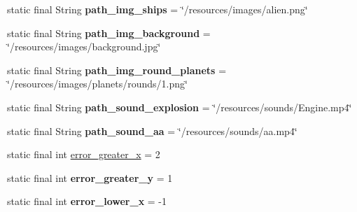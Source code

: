 \begin{DoxyCompactItemize}
static final String {\bfseries path\+\_\+img\+\_\+ships} = \char`\"{}/resources/images/alien.\+png\char`\"{}
\item 
\mbox{\label{classfr_1_1groupe40_1_1projet_1_1util_1_1_Constants_a856e41952c8ff7dfcf4fca745158b1f8}} 
static final String {\bfseries path\+\_\+img\+\_\+background} = \char`\"{}/resources/images/background.\+jpg\char`\"{}
\item 
\mbox{\label{classfr_1_1groupe40_1_1projet_1_1util_1_1_Constants_ae38a63f959bf2dfa3323116ce1a6ed97}} 
static final String {\bfseries path\+\_\+img\+\_\+round\+\_\+planets} = \char`\"{}/resources/images/planets/rounds/1.png\char`\"{}
\item 
\mbox{\label{classfr_1_1groupe40_1_1projet_1_1util_1_1_Constants_a5f11c8e5328f29b02c0d2ecaf2e956e8}} 
static final String {\bfseries path\+\_\+sound\+\_\+explosion} = \char`\"{}/resources/sounds/Engine.\+mp4\char`\"{}
\item 
\mbox{\label{classfr_1_1groupe40_1_1projet_1_1util_1_1_Constants_a6dfc890788fa7a55f9194e90e8964a81}} 
static final String {\bfseries path\+\_\+sound\+\_\+aa} = \char`\"{}/resources/sounds/aa.\+mp4\char`\"{}
\item 
static final int \mbox{\hyperlink{classfr_1_1groupe40_1_1projet_1_1util_1_1_Constants_a338cc553a2a019cfc248741a981e5874}{error\+\_\+greater\+\_\+x}} = 2
\item 
\mbox{\label{classfr_1_1groupe40_1_1projet_1_1util_1_1_Constants_aec60ac263e8c5fdc8de6f3a0f945ede2}} 
static final int {\bfseries error\+\_\+greater\+\_\+y} = 1
\item 
\mbox{\label{classfr_1_1groupe40_1_1projet_1_1util_1_1_Constants_a95f10dc55de1dba3b07fbb7354fa9a76}} 
static final int {\bfseries error\+\_\+lower\+\_\+x} = -\/1
\item 
\mbox{\label{classfr_1_1groupe40_1_1projet_1_1util_1_1_Constants_a1e30c221c612fd160382d4b05290cb4c}} 

\end{DoxyCompactItemize}

